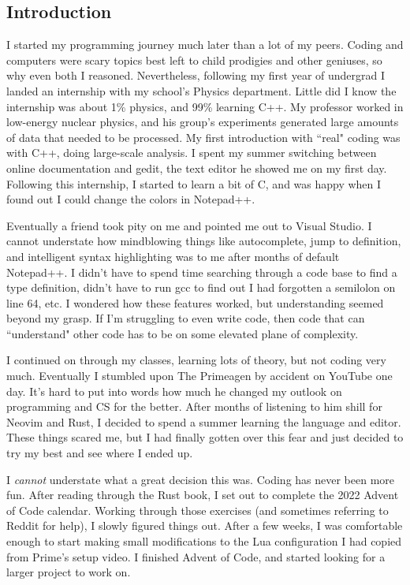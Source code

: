 \subsection{Introduction}

I started my programming journey much later than a lot of my peers.
Coding and computers were scary topics best left to child prodigies and other geniuses,
so why even both I reasoned. Nevertheless, following my first year of undergrad
I landed an internship with my school's Physics department. Little did I know the
internship was about 1\% physics, and 99\% learning C++. My professor worked in
low-energy nuclear physics, and his group's experiments generated large amounts
of data that needed to be processed. My first introduction with ``real" coding 
was with C++, doing large-scale analysis. I spent my summer switching between online
documentation and gedit, the text editor he showed me on my first day. Following
this internship, I started to learn a bit of C, and was happy when I found out
I could change the colors in Notepad++.

Eventually a friend took pity on me and pointed me out to Visual Studio. 
I cannot understate how mindblowing things like autocomplete, jump to definition, 
and intelligent syntax highlighting was to me after months of default Notepad++.
I didn't have to spend time searching through a code base to find a type definition,
didn't have to run gcc to find out I had forgotten a semilolon on line 64, etc.
I wondered how these features worked, but understanding seemed beyond my grasp. 
If I'm struggling to even write code, then code that can ``understand" other code 
has to be on some elevated plane of complexity.

I continued on through my classes, learning lots of theory, but not coding very
much. Eventually I stumbled upon The Primeagen by accident on YouTube one day. It's
hard to put into words how much he changed my outlook on programming and CS for 
the better. After months of listening to him shill for Neovim and Rust, I decided
to spend a summer learning the language and editor. These things scared me, but
I had finally gotten over this fear and just decided to try my best and see where
I ended up. 

I \textit{cannot} understate what a great decision this was. Coding has never been
more fun. After reading through the Rust book, I set out to complete the 2022 Advent
of Code calendar.  Working through those exercises (and sometimes referring to Reddit
for help), I slowly figured things out. After a few weeks, I was comfortable enough
to start making small modifications to the Lua configuration I had copied from 
Prime's setup video. I finished Advent of Code, and started looking for a larger
project to work on.

